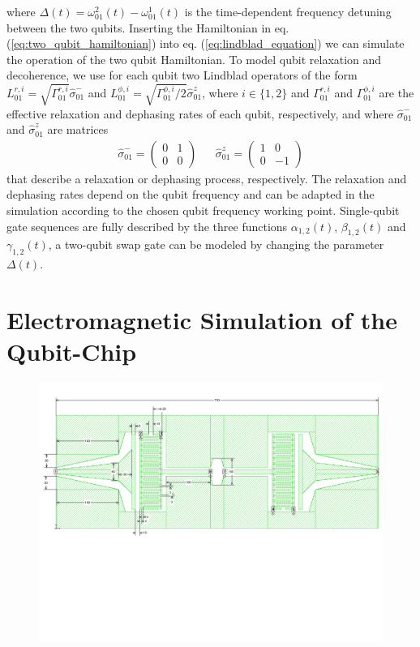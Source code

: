 %
where $\Delta(t)=\omega_{01}^2(t)-\omega_{01}^1(t)$ is the time-dependent frequency detuning between the two qubits. Inserting the Hamiltonian in eq. (\ref{eq:two_qubit_hamiltonian}) into eq. (\ref{eq:lindblad_equation}) we can simulate the operation of the two qubit Hamiltonian. To model qubit relaxation and decoherence, we use for each qubit two Lindblad operators of the form $L_{01}^{r,i}=\sqrt{\Gamma_{01}^{r,i}}\hat{\sigma}_{01}^-$ and $L_{01}^{\phi,i}=\sqrt{\Gamma_{01}^{\phi,i}/2}\hat{\sigma}_{01}^z$, where $i\in\{1,2\}$ and $\Gamma_{01}^{r,i}$ and $\Gamma_{01}^{\phi,i}$ are the effective relaxation and dephasing rates of each qubit, respectively, and where $\hat{\sigma}_{01}^-$ and $\hat{\sigma}_{01}^z$ are matrices
%
\begin{align}
\hat{\sigma}_{01}^-  =  \left( \begin{array}{cc} 0 & 1 \\ 0 & 0 \end{array} \right) & & \hat{\sigma}_{01}^z  =  \left( \begin{array}{cc} 1 & 0 \\ 0 & -1 \end{array}\right)
\end{align}
%
that describe a relaxation or dephasing process, respectively. The relaxation and dephasing rates depend on the qubit frequency and can be adapted in the simulation according to the chosen qubit frequency working point. Single-qubit gate sequences are fully described by the three functions $\alpha_{1,2}(t)$, $\beta_{1,2}(t)$ and $\gamma_{1,2}(t)$, a two-qubit swap gate can be modeled by changing the parameter $\Delta(t)$.

\section{Electromagnetic Simulation of the Qubit-Chip}

\begin{figure}[ht!]
	\centering
	\includegraphics[width=\textwidth]{./material/figures/2-qubit-processor/sonnet_simulation_of_qubit_chip}
	\caption[]{}
	\label{fig:sonnet_model_of_qubit_chip}
\end{figure}

